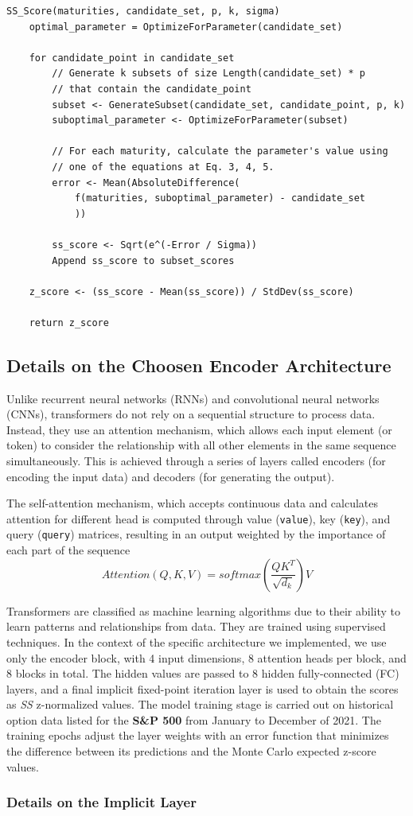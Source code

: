 \begin{lstlisting}
SS_Score(maturities, candidate_set, p, k, sigma)
	optimal_parameter = OptimizeForParameter(candidate_set)
	
	for candidate_point in candidate_set
		// Generate k subsets of size Length(candidate_set) * p
		// that contain the candidate_point
		subset <- GenerateSubset(candidate_set, candidate_point, p, k)
		suboptimal_parameter <- OptimizeForParameter(subset)
		
		// For each maturity, calculate the parameter's value using
		// one of the equations at Eq. 3, 4, 5.
		error <- Mean(AbsoluteDifference(
			f(maturities, suboptimal_parameter) - candidate_set
			))
		
		ss_score <- Sqrt(e^(-Error / Sigma))
		Append ss_score to subset_scores
	
	z_score <- (ss_score - Mean(ss_score)) / StdDev(ss_score)
	
	return z_score	
\end{lstlisting}

\subsection{Details on the Choosen Encoder Architecture}

Unlike recurrent neural networks (RNNs) and convolutional neural networks (CNNs), transformers do not rely on a sequential structure to process data. Instead, they use an attention mechanism, which allows each input element (or token) to consider the relationship with all other elements in the same sequence simultaneously. This is achieved through a series of layers called encoders (for encoding the input data) and decoders (for generating the output).

The self-attention mechanism, which accepts continuous data and calculates attention for different head is computed through value (\texttt{value}), key (\texttt{key}), and query (\texttt{query}) matrices, resulting in an output weighted by the importance of each part of the sequence \citep{Wen2023, Vaswani2023}
\begin{equation}
	\textit{Attention}(Q, K, V) = \textit{softmax}\left(\frac{QK^T}{\sqrt{d_k}}\right)V
\end{equation}

Transformers are classified as machine learning algorithms due to their ability to learn patterns and relationships from data. They are trained using supervised techniques. In the context of the specific architecture we implemented, we use only the encoder block, with 4 input dimensions, 8 attention heads per block, and 8 blocks in total. The hidden values are passed to 8 hidden fully-connected (FC) layers, and a final implicit fixed-point iteration layer is used to obtain the scores as \textit{SS} z-normalized values. The model training stage is carried out on historical option data listed for the \textbf{S\&P 500} from January to December of 2021. The training epochs adjust the layer weights with an error function that minimizes the difference between its predictions and the Monte Carlo expected z-score values.

\subsubsection{Details on the Implicit Layer}

